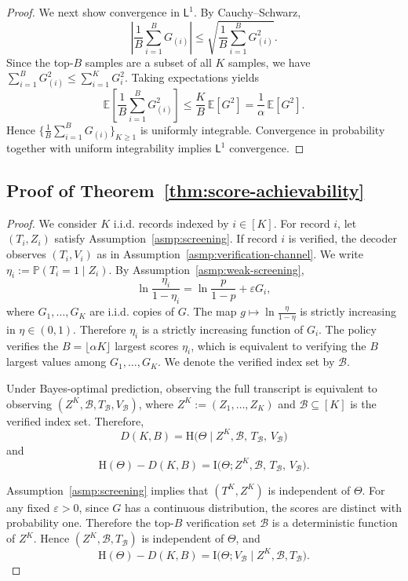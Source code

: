 \documentclass[twocolumn]{scholar7}
\newcommand{\cB}{\mathcal{B}}
\newcommand{\E}{\mathbb{E}}
\newcommand{\Prob}{\mathbb{P}}
\newcommand{\I}{\mathrm{I}}
\newcommand{\Hh}{\mathrm{H}}
\newcommand{\abs}[1]{\left|#1\right|}
\newcommand{\bracks}[1]{\left[#1\right]}
\newcommand{\idx}[1]{\bracks{#1}} %
\begin{document}
\begin{appendix}
\begin{proof}
We next show convergence in $\mathsf{L}^1$.
By Cauchy--Schwarz,
\[
\abs{\frac{1}{B}\sum_{i=1}^B G_{(i)}}
\le
\sqrt{\frac{1}{B}\sum_{i=1}^B G_{(i)}^2}.
\]
Since the top-$B$ samples are a subset of all $K$ samples, we have
$\sum_{i=1}^B G_{(i)}^2 \le \sum_{i=1}^K G_i^2$.
Taking expectations yields
\[
\E\bracks{\frac{1}{B}\sum_{i=1}^B G_{(i)}^2}
\le
\frac{K}{B}\,\E[G^2]
=
\frac{1}{\alpha}\,\E[G^2].
\]
Hence $\{\frac{1}{B}\sum_{i=1}^B G_{(i)}\}_{K\ge 1}$ is uniformly integrable.
Convergence in probability together with uniform integrability implies $\mathsf{L}^1$ convergence.
\end{proof}

\subsection{Proof of Theorem~\ref{thm:score-achievability}}
\begin{proof}
We consider $K$ i.i.d. records indexed by $i\in\idx{K}$.
For record $i$, let $(T_i,Z_i)$ satisfy Assumption~\ref{asmp:screening}.
If record $i$ is verified, the decoder observes $(T_i,V_i)$ as in Assumption~\ref{asmp:verification-channel}.
We write $\eta_i:=\Prob(T_i=1\mid Z_i)$.
By Assumption~\ref{asmp:weak-screening},
\[
\ln\frac{\eta_i}{1-\eta_i}
=
\ln\frac{p}{1-p}+\varepsilon G_i,
\]
where $G_1,\dots,G_K$ are i.i.d. copies of $G$.
The map $g\mapsto \ln\frac{\eta}{1-\eta}$ is strictly increasing in $\eta\in(0,1)$.
Therefore $\eta_i$ is a strictly increasing function of $G_i$.
The policy verifies the $B=\lfloor \alpha K\rfloor$ largest scores $\eta_i$, which is equivalent to verifying the $B$ largest values among $G_1,\dots,G_K$.
We denote the verified index set by $\cB$.

Under Bayes-optimal prediction, observing the full transcript is equivalent to observing
$(Z^K,\cB,T_{\cB},V_{\cB})$, where $Z^K:=(Z_1,\dots,Z_K)$ and $\cB\subseteq\idx{K}$ is the verified index set.
Therefore,
\[
D(K,B)=\Hh\big(\Theta\mid Z^K,\cB,\,T_{\cB},\,V_{\cB}\big)
\]
and
\[
\Hh(\Theta)-D(K,B)=\I\big(\Theta;Z^K,\cB,\,T_{\cB},\,V_{\cB}\big).
\]

Assumption~\ref{asmp:screening} implies that $(T^K,Z^K)$ is independent of $\Theta$.
For any fixed $\varepsilon>0$, since $G$ has a continuous distribution, the scores are distinct with probability one.
Therefore the top-$B$ verification set $\cB$ is a deterministic function of $Z^K$.
Hence $(Z^K,\cB,T_{\cB})$ is independent of $\Theta$, and
\[
\Hh(\Theta)-D(K,B)=\I\big(\Theta;V_{\cB}\mid Z^K,\cB,T_{\cB}\big).
\]


\end{proof}
\end{appendix}
\end{document}
